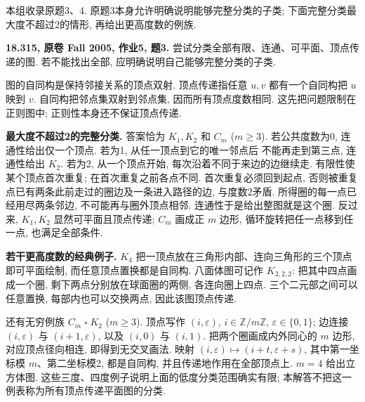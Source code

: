 本组收录原题3、4. 原题3本身允许明确说明能够完整分类的子类;
下面完整分类最大度不超过2的情形, 再给出更高度数的例族.

\begin{exercise}\label{mit:18315-hw5-q3}
\textbf{18.315, 原卷 Fall 2005, 作业5, 题3.}
尝试分类全部有限、连通、可平面、顶点传递的图.
若不能找出全部, 应明确说明自己能够完整分类的子类.
\end{exercise}
\begin{solution}
图的自同构是保持邻接关系的顶点双射. 顶点传递指任意 $u,v$ 都有一个自同构把
$u$ 映到 $v$. 自同构把邻点集双射到邻点集, 因而所有顶点度数相同.
这先把问题限制在正则图中; 正则性本身还不保证顶点传递.

\textbf{最大度不超过2的完整分类.}
答案恰为 $K_1,K_2$ 和 $C_m$ ($m\ge3$).
若公共度数为0, 连通性给出仅一个顶点. 若为1, 从任一顶点到它的唯一邻点后
不能再走到第三点, 连通性给出 $K_2$.
若为2, 从一个顶点开始, 每次沿着不同于来边的边继续走.
有限性使某个顶点首次重复; 在首次重复之前各点不同.
首次重复必须回到起点, 否则被重复点已有两条此前走过的圈边及一条进入路径的边,
与度数2矛盾. 所得圈的每一点已经用尽两条邻边, 不可能再与圈外顶点相邻.
连通性于是给出整图就是这个圈.
反过来, $K_1,K_2$ 显然可平面且顶点传递;
$C_m$ 画成正 $m$ 边形, 循环旋转把任一点移到任一点, 也满足全部条件.

\textbf{若干更高度数的经典例子.}
$K_4$ 把一顶点放在三角形内部、连向三角形的三个顶点即可平面绘制,
而任意顶点置换都是自同构. 八面体图可记作 $K_{2,2,2}$:
把其中四点画成一个圈, 剩下两点分别放在球面圈的两侧,
各连向圈上四点. 三个二元部之间可以任意置换, 每部内也可以交换两点,
因此该图顶点传递.

还有无穷例族 $C_m\mathbin\square K_2$ ($m\ge3$).
顶点写作 $(i,\varepsilon)$, $i\in\mathbb Z/m\mathbb Z$, $\varepsilon\in\{0,1\}$;
边连接 $(i,\varepsilon)$ 与 $(i+1,\varepsilon)$, 以及 $(i,0)$ 与 $(i,1)$.
把两个圈画成内外同心的 $m$ 边形, 对应顶点径向相连, 即得到无交叉画法.
映射 $(i,\varepsilon)\mapsto(i+t,\varepsilon+s)$,
其中第一坐标模 $m$、第二坐标模2, 都是自同构, 并且传递地作用在全部顶点上.
$m=4$ 给出立方体图. 这些三度、四度例子说明上面的低度分类范围确实有限;
本解答不把这一例表称为所有顶点传递平面图的分类.
\end{solution}


